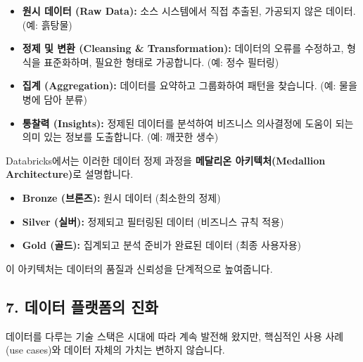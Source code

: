 \documentclass[11pt,a4paper]{article}
\theoremstyle{definition}
\begin{document}
\begin{itemize}
    \item \textbf{원시 데이터 (Raw Data):} 소스 시스템에서 직접 추출된, 가공되지 않은 데이터. (예: 흙탕물)
    \item \textbf{정제 및 변환 (Cleansing & Transformation):} 데이터의 오류를 수정하고, 형식을 표준화하며, 필요한 형태로 가공합니다. (예: 정수 필터링)
    \item \textbf{집계 (Aggregation):} 데이터를 요약하고 그룹화하여 패턴을 찾습니다. (예: 물을 병에 담아 분류)
    \item \textbf{통찰력 (Insights):} 정제된 데이터를 분석하여 비즈니스 의사결정에 도움이 되는 의미 있는 정보를 도출합니다. (예: 깨끗한 생수)
\end{itemize}

\begin{infobox}
Databricks에서는 이러한 데이터 정제 과정을 \textbf{메달리온 아키텍처(Medallion Architecture)}로 설명합니다.
\begin{itemize}
    \item \textbf{Bronze (브론즈):} 원시 데이터 (최소한의 정제)
    \item \textbf{Silver (실버):} 정제되고 필터링된 데이터 (비즈니스 규칙 적용)
    \item \textbf{Gold (골드):} 집계되고 분석 준비가 완료된 데이터 (최종 사용자용)
\end{itemize}
이 아키텍처는 데이터의 품질과 신뢰성을 단계적으로 높여줍니다.
\end{infobox}

\subsection*{7. 데이터 플랫폼의 진화}

데이터를 다루는 기술 스택은 시대에 따라 계속 발전해 왔지만, 핵심적인 사용 사례(use cases)와 데이터 자체의 가치는 변하지 않습니다.
\end{document}
